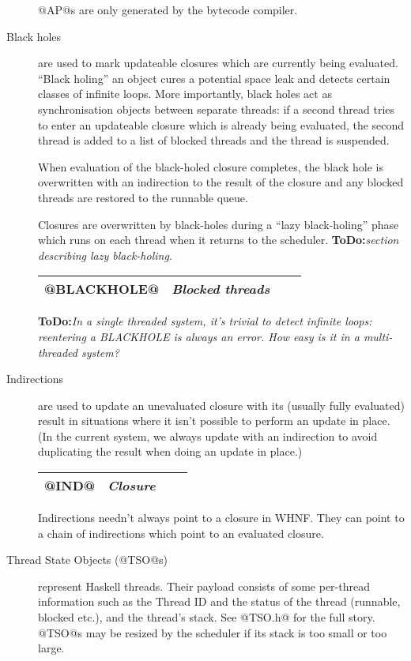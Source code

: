 \documentclass[11pt]{article}
\newcommand{\ToDo}[1]{{{\bf ToDo:}\sl #1}}
\begin{document}
\begin{description}
@AP@s are only generated by the bytecode compiler.

\item[Black holes] are used to mark updateable closures which are
currently being evaluated.  ``Black holing'' an object cures a
potential space leak and detects certain classes of infinite loops.
More importantly, black holes act as synchronisation objects between
separate threads: if a second thread tries to enter an updateable
closure which is already being evaluated, the second thread is added
to a list of blocked threads and the thread is suspended.

When evaluation of the black-holed closure completes, the black hole
is overwritten with an indirection to the result of the closure and
any blocked threads are restored to the runnable queue.

Closures are overwritten by black-holes during a ``lazy black-holing''
phase which runs on each thread when it returns to the scheduler.
\ToDo{section describing lazy black-holing}.

\begin{center}
\begin{tabular}{|l|l|l|l|}\hline
@BLACKHOLE@ & \emph{Blocked threads} \\ \hline
\end{tabular}
\end{center}

\ToDo{In a single threaded system, it's trivial to detect infinite
loops: reentering a BLACKHOLE is always an error.  How easy is it in a
multi-threaded system?}

\item[Indirections] are used to update an unevaluated closure with its
(usually fully evaluated) result in situations where it isn't possible
to perform an update in place.  (In the current system, we always
update with an indirection to avoid duplicating the result when doing
an update in place.)

\begin{center}
\begin{tabular}{|l|l|l|l|}\hline
@IND@ & \emph{Closure} \\ \hline
\end{tabular}
\end{center}

Indirections needn't always point to a closure in WHNF.  They can
point to a chain of indirections which point to an evaluated closure.

\item[Thread State Objects (@TSO@s)] represent Haskell threads.  Their
payload consists of some per-thread information such as the Thread ID
and the status of the thread (runnable, blocked etc.), and the
thread's stack.  See @TSO.h@ for the full story.  @TSO@s may be
resized by the scheduler if its stack is too small or too large.


\end{description}
\end{document}
